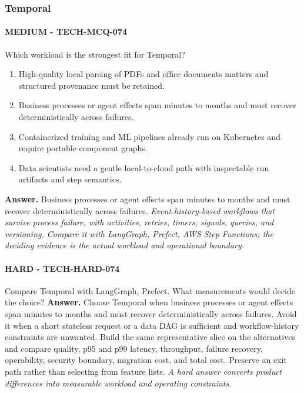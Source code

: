 \subsubsection*{Temporal}
\paragraph{MEDIUM - TECH-MCQ-074} Which workload is the strongest fit for Temporal?
\begin{enumerate}[label=\Alph*.]
\item High-quality local parsing of PDFs and office documents matters and structured provenance must be retained.
\item Business processes or agent effects span minutes to months and must recover deterministically across failures.
\item Containerized training and ML pipelines already run on Kubernetes and require portable component graphs.
\item Data scientists need a gentle local-to-cloud path with inspectable run artifacts and step semantics.
\end{enumerate}
\textbf{Answer.} Business processes or agent effects span minutes to months and must recover deterministically across failures.
\textit{Event-history-based workflows that survive process failure, with activities, retries, timers, signals, queries, and versioning. Compare it with LangGraph, Prefect, AWS Step Functions; the deciding evidence is the actual workload and operational boundary.}
\paragraph{HARD - TECH-HARD-074} Compare Temporal with LangGraph, Prefect. What measurements would decide the choice?
\textbf{Answer.} Choose Temporal when business processes or agent effects span minutes to months and must recover deterministically across failures. Avoid it when a short stateless request or a data DAG is sufficient and workflow-history constraints are unwanted. Build the same representative slice on the alternatives and compare quality, p95 and p99 latency, throughput, failure recovery, operability, security boundary, migration cost, and total cost. Preserve an exit path rather than selecting from feature lists.
\textit{A hard answer converts product differences into measurable workload and operating constraints.}
